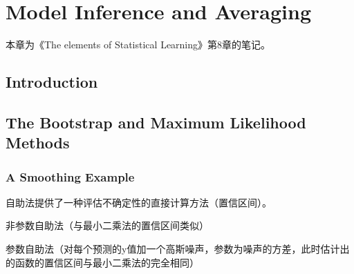 \chapter{Model Inference and Averaging}
    本章为《The elements of Statistical Learning》第8章的笔记。
    \section{Introduction}
    \section{The Bootstrap and Maximum Likelihood Methods}
        \subsection{A Smoothing Example}
            自助法提供了一种评估不确定性的直接计算方法（置信区间）。
            \begindot
                \item 非参数自助法（与最小二乘法的置信区间类似）
                \item 参数自助法（对每个预测的y值加一个高斯噪声，参数为噪声的方差，此时估计出的函数的置信区间与最小二乘法的完全相同）
            \myenddot